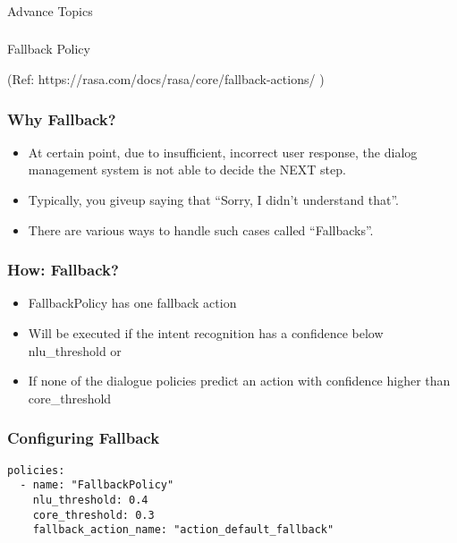 \begin{frame}[fragile]\frametitle{}
\begin{center}
{\Large Advance Topics}

\end{center}
\end{frame}

\begin{frame}[fragile]\frametitle{}
\begin{center}
{\Large Fallback Policy}

{\tiny (Ref: https://rasa.com/docs/rasa/core/fallback-actions/ )}
\end{center}
\end{frame}

 \begin{frame}[fragile]\frametitle{Why Fallback?}
\begin{itemize}
\item At certain point, due to insufficient, incorrect user response, the dialog management system is not able to decide the NEXT step.
\item Typically, you give\-up saying that ``Sorry, I didn’t understand that''.
\item There are various ways to handle such cases called ``Fallbacks''.
\end{itemize}
\end{frame}

 \begin{frame}[fragile]\frametitle{How: Fallback?}
\begin{itemize}
\item FallbackPolicy has one fallback action
\item Will be executed if the intent recognition has a confidence below nlu\_threshold or
\item If none of the dialogue policies predict an action with confidence higher than core\_threshold
\end{itemize}
\end{frame}

 \begin{frame}[fragile]\frametitle{Configuring Fallback}
\begin{lstlisting}
policies:
  - name: "FallbackPolicy"
    nlu_threshold: 0.4
    core_threshold: 0.3
    fallback_action_name: "action_default_fallback"
\end{lstlisting}
\end{frame}

